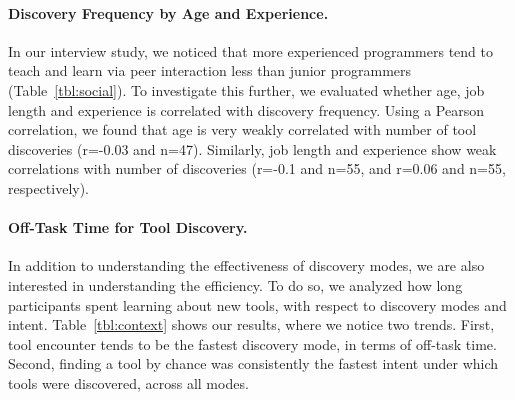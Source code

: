 \documentclass[smallextended]{svjour3}
\newcommand\contexts{modes\xspace}
\begin{document}
\paragraph{Discovery Frequency by Age and Experience.}

In our interview study, we noticed that more experienced programmers
tend to teach and learn via peer interaction less than junior programmers (Table~\ref{tbl:social}).
To investigate this further, we evaluated whether age, job length and experience is 
correlated with discovery frequency.
Using a Pearson correlation, we found that age is very weakly correlated with number of tool discoveries (r=-0.03 and n=47). 
Similarly, job length and experience show weak correlations with number of discoveries (r=-0.1 and n=55, and r=0.06 and n=55, respectively).

\paragraph{Off-Task Time for Tool Discovery.}

In addition to understanding the effectiveness of discovery \contexts,
we are also interested in understanding the efficiency.
To do so, we analyzed how long participants spent 
learning about new tools, with respect to 
discovery modes and intent.
Table~\ref{tbl:context} shows our results, where
we notice two trends.
First, tool encounter tends to be the fastest discovery mode,
in terms of off-task time.
Second, finding a tool by chance was consistently the fastest
intent under which tools were discovered, across all modes.
\end{document}
